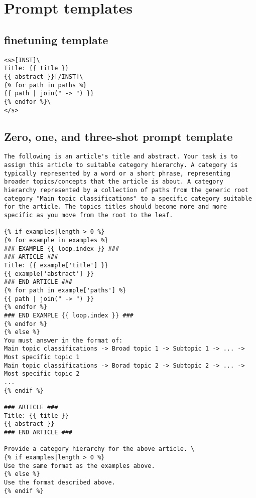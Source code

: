 \section{Prompt templates}  \label{appendix:prompt-template}

\subsection*{\name finetuning template}

\begin{lstlisting}[frame=single]
<s>[INST]\
Title: {{ title }}
{{ abstract }}[/INST]\
{% for path in paths %}
{{ path | join(" -> ") }}
{% endfor %}\
</s>
\end{lstlisting}

\subsection*{Zero, one, and three-shot prompt template}

\begin{lstlisting}[frame=single]
The following is an article's title and abstract. Your task is to assign this article to suitable category hierarchy. A category is typically represented by a word or a short phrase, representing broader topics/concepts that the article is about. A category hierarchy represented by a collection of paths from the generic root category "Main topic classifications" to a specific category suitable for the article. The topics titles should become more and more specific as you move from the root to the leaf. 

{% if examples|length > 0 %}
{% for example in examples %}
### EXAMPLE {{ loop.index }} ###
### ARTICLE ###
Title: {{ example['title'] }}
{{ example['abstract'] }}
### END ARTICLE ###
{% for path in example['paths'] %}
{{ path | join(" -> ") }}
{% endfor %}
### END EXAMPLE {{ loop.index }} ###
{% endfor %}
{% else %}
You must answer in the format of:
Main topic classifications -> Broad topic 1 -> Subtopic 1 -> ... -> Most specific topic 1
Main topic classifications -> Borad topic 2 -> Subtopic 2 -> ... -> Most specific topic 2
...
{% endif %}

### ARTICLE ###
Title: {{ title }}
{{ abstract }}
### END ARTICLE ###

Provide a category hierarchy for the above article. \
{% if examples|length > 0 %}
Use the same format as the examples above.
{% else %}
Use the format described above.
{% endif %}
\end{lstlisting}

